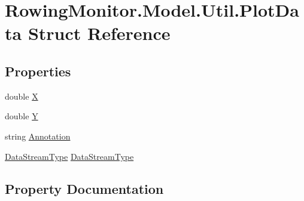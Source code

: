 \hypertarget{struct_rowing_monitor_1_1_model_1_1_util_1_1_plot_data}{}\section{Rowing\+Monitor.\+Model.\+Util.\+Plot\+Data Struct Reference}
\label{struct_rowing_monitor_1_1_model_1_1_util_1_1_plot_data}
\subsection*{Properties}
\begin{DoxyCompactItemize}
\item 
double \hyperlink{struct_rowing_monitor_1_1_model_1_1_util_1_1_plot_data_aecf4f967ff34d6f3ff541792a3de2cb2}{X}
\item 
double \hyperlink{struct_rowing_monitor_1_1_model_1_1_util_1_1_plot_data_ad481a32ecc84d09b772a1e7737728e46}{Y}
\item 
string \hyperlink{struct_rowing_monitor_1_1_model_1_1_util_1_1_plot_data_a1ea10a21ea1ba58e32f59a6fe97d3f40}{Annotation}
\item 
\hyperlink{namespace_rowing_monitor_1_1_model_1_1_util_a01e1a06061533b246feb7421c9d0107f}{Data\+Stream\+Type} \hyperlink{struct_rowing_monitor_1_1_model_1_1_util_1_1_plot_data_a774cc0b6b03996964e6bde85b993ca2d}{Data\+Stream\+Type}
\end{DoxyCompactItemize}


\subsection{Property Documentation}
\mbox{\label{struct_rowing_monitor_1_1_model_1_1_util_1_1_plot_data_a1ea10a21ea1ba58e32f59a6fe97d3f40}} 

